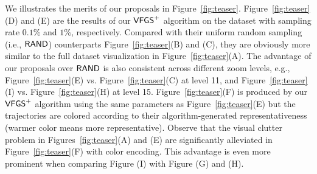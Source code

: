 We illustrates the merits of our proposals in Figure~\ref{fig:teaser}. Figure~\ref{fig:teaser}(D) and (E) are the results of our $\mathsf{VFGS}^{+}{}$ algorithm on the \pt{} dataset with sampling rate $0.1\%$ and $1\%$, respectively. Compared with their uniform random sampling (i.e., $\mathsf{RAND}$) counterparts Figure~\ref{fig:teaser}(B) and (C), they are obviously more similar to the full dataset visualization in Figure~\ref{fig:teaser}(A). The advantage of our proposals over $\mathsf{RAND}$ is also consistent across different zoom levels, e.g., Figure~\ref{fig:teaser}(E) vs. Figure~\ref{fig:teaser}(C) at level 11, and Figure~\ref{fig:teaser}(I) vs. Figure~\ref{fig:teaser}(H) at level 15. Figure~\ref{fig:teaser}(F) is produced by our $\mathsf{VFGS}^{+}{}$ algorithm using the same parameters as Figure~\ref{fig:teaser}(E) but the trajectories are colored according to their algorithm-generated representativeness (warmer color means more representative). Observe that the visual clutter problem in Figures~\ref{fig:teaser}(A) and (E) are significantly alleviated in Figure~\ref{fig:teaser}(F) with color encoding. This advantage is even more prominent when comparing Figure (I) with Figure (G) and (H).





